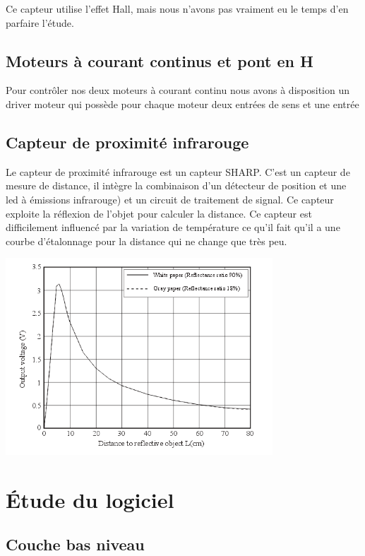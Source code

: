 \documentclass{article}
\begin{document}
Ce capteur utilise l'effet Hall, mais nous n'avons pas vraiment eu le temps d'en parfaire l'étude.

\subsection{Moteurs à courant continus et pont en H}

Pour contrôler nos deux moteurs à courant continu nous avons à disposition un driver moteur qui possède pour chaque moteur deux entrées de sens et une entrée 

\subsection{Capteur de proximité infrarouge}

Le capteur de proximité infrarouge est un capteur SHARP. C'est un capteur de mesure de distance, il intègre la combinaison d'un détecteur de position et une led à émissions infrarouge) et un circuit de traitement de signal. Ce capteur exploite la réflexion de l'objet pour calculer la distance. Ce capteur est difficilement influencé par la variation de température ce qu'il fait qu'il a une courbe d'étalonnage pour la distance qui ne change que très peu.

\begin{center}
  \includegraphics[width=10cm]{sharp_courbe.png}
\end{center}

\section{Étude du logiciel}

\subsection{Couche bas niveau}
\end{document}
